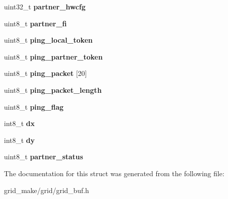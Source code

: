 \begin{DoxyCompactItemize}
\item 
\hypertarget{structgrid__port_a9ad704102a8e5b8ff003cad468df5364}{uint32\-\_\-t {\bfseries partner\-\_\-hwcfg}}\label{structgrid__port_a9ad704102a8e5b8ff003cad468df5364}

\item 
\hypertarget{structgrid__port_aa9f82a1145030ef33061a26b6fe5a526}{uint8\-\_\-t {\bfseries partner\-\_\-fi}}\label{structgrid__port_aa9f82a1145030ef33061a26b6fe5a526}

\item 
\hypertarget{structgrid__port_ab6c7b190f382d0ae62daa9e2e6dad639}{uint8\-\_\-t {\bfseries ping\-\_\-local\-\_\-token}}\label{structgrid__port_ab6c7b190f382d0ae62daa9e2e6dad639}

\item 
\hypertarget{structgrid__port_af2992d5229ae816034fe81a3a4f53017}{uint8\-\_\-t {\bfseries ping\-\_\-partner\-\_\-token}}\label{structgrid__port_af2992d5229ae816034fe81a3a4f53017}

\item 
\hypertarget{structgrid__port_abc81dd7edc64c3fb25a1b433966ebf00}{uint8\-\_\-t {\bfseries ping\-\_\-packet} \mbox{[}20\mbox{]}}\label{structgrid__port_abc81dd7edc64c3fb25a1b433966ebf00}

\item 
\hypertarget{structgrid__port_a920152203b02d4e988be43d3f9972bd9}{uint8\-\_\-t {\bfseries ping\-\_\-packet\-\_\-length}}\label{structgrid__port_a920152203b02d4e988be43d3f9972bd9}

\item 
\hypertarget{structgrid__port_a2dc47c259fb7aa557bbf7ecaef8eabda}{uint8\-\_\-t {\bfseries ping\-\_\-flag}}\label{structgrid__port_a2dc47c259fb7aa557bbf7ecaef8eabda}

\item 
\hypertarget{structgrid__port_ab18d29fef143f601ac60733003b6f1cd}{int8\-\_\-t {\bfseries dx}}\label{structgrid__port_ab18d29fef143f601ac60733003b6f1cd}

\item 
\hypertarget{structgrid__port_ab89c09e7786d976c2d9b3c5a1b97d331}{int8\-\_\-t {\bfseries dy}}\label{structgrid__port_ab89c09e7786d976c2d9b3c5a1b97d331}

\item 
\hypertarget{structgrid__port_a67f6b0179285a78bf116b84f7e13fd4f}{uint8\-\_\-t {\bfseries partner\-\_\-status}}\label{structgrid__port_a67f6b0179285a78bf116b84f7e13fd4f}

\end{DoxyCompactItemize}


The documentation for this struct was generated from the following file\-:\begin{DoxyCompactItemize}
\item 
grid\-\_\-make/grid/grid\-\_\-buf.\-h\end{DoxyCompactItemize}
